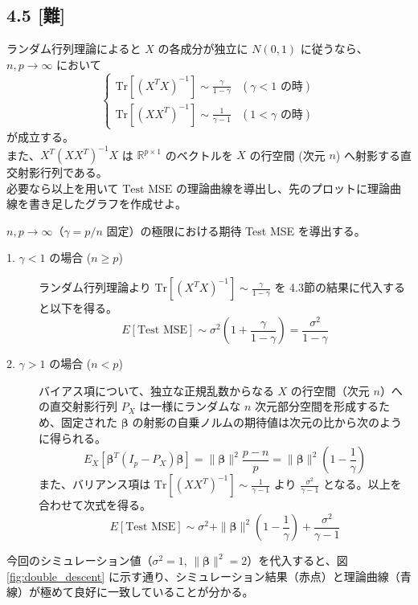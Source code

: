 \documentclass[11pt,a4paper,dvipdfmx]{article}
\numberwithin{equation}{section}
\newenvironment{note}[0]
{
    \begin{tcolorbox}[sharp corners, colframe=gray!20, colback=gray!20, width=\textwidth]
}
{
    \end{tcolorbox}
}
\begin{document}
\subsection*{4.5 [難]}
\begin{note}
ランダム行列理論によると $X$ の各成分が独立に $N(0, 1)$ に従うなら、$n, p \to \infty$ において
\begin{equation*}
\begin{cases}
\text{Tr}\left[(X^T X)^{-1}\right] \sim \frac{\gamma}{1-\gamma} & (\gamma < 1 \text{ の時}) \\
\text{Tr}\left[(X X^T)^{-1}\right] \sim \frac{1}{\gamma-1} & (1 < \gamma \text{ の時})
\end{cases}
\end{equation*}
が成立する。\\
また、$X^T (X X^T)^{-1} X$ は $\mathbb{R}^{p \times 1}$ のベクトルを $X$ の行空間 (次元 $n$) へ射影する直交射影行列である。\\
必要なら以上を用いて $\text{Test MSE}$ の理論曲線を導出し、先のプロットに理論曲線を書き足したグラフを作成せよ。
\end{note}
\begin{proofbox}
$n, p \to \infty$（$\gamma = p/n$ 固定）の極限における期待 Test MSE を導出する。

\begin{description}
    \item[1. $\gamma < 1$ の場合 ($n \ge p$)]
    ランダム行列理論より $\text{Tr}\left[(X^T X)^{-1}\right] \sim \frac{\gamma}{1-\gamma}$ を 4.3節の結果に代入すると以下を得る。
    \begin{equation}
    E[\text{Test MSE}] \sim \sigma^2 \left(1 + \frac{\gamma}{1-\gamma}\right) = \frac{\sigma^2}{1-\gamma}
    \end{equation}

    \item[2. $\gamma > 1$ の場合 ($n < p$)]
    バイアス項について、独立な正規乱数からなる $X$ の行空間（次元 $n$）への直交射影行列 $P_X$ は一様にランダムな $n$ 次元部分空間を形成するため、固定された $\bm{\beta}$ の射影の自乗ノルムの期待値は次元の比から次のように得られる。
    \begin{equation}
    E_X \left[ \bm{\beta}^T (I_p - P_X) \bm{\beta} \right] = \|\bm{\beta}\|^2 \frac{p-n}{p} = \|\bm{\beta}\|^2 \left( 1 - \frac{1}{\gamma} \right)
    \end{equation}
    また、バリアンス項は $\text{Tr}\left[(X X^T)^{-1}\right] \sim \frac{1}{\gamma-1}$ より $\frac{\sigma^2}{\gamma-1}$ となる。以上を合わせて次式を得る。
    \begin{equation}
    E[\text{Test MSE}] \sim \sigma^2 + \|\bm{\beta}\|^2 \left( 1 - \frac{1}{\gamma} \right) + \frac{\sigma^2}{\gamma - 1}
    \end{equation}
\end{description}

今回のシミュレーション値（$\sigma^2 = 1$, $\|\bm{\beta}\|^2 = 2$）を代入すると、図\ref{fig:double_descent} に示す通り、シミュレーション結果（赤点）と理論曲線（青線）が極めて良好に一致していることが分かる。
\end{proofbox}
\end{document}
